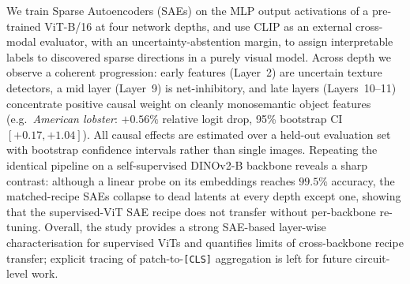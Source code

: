 We train Sparse Autoencoders (SAEs) on the MLP output activations of a pre-trained ViT-B/16 at four network depths, and use CLIP as an external cross-modal evaluator, with an uncertainty-abstention margin, to assign interpretable labels to discovered sparse directions in a purely visual model. Across depth we observe a coherent progression: early features (Layer~2) are uncertain texture detectors, a mid layer (Layer~9) is net-inhibitory, and late layers (Layers~10--11) concentrate positive causal weight on cleanly monosemantic object features (e.g.\ \textit{American lobster}: $+0.56\%$ relative logit drop, 95\% bootstrap CI $[+0.17,+1.04]$). All causal effects are estimated over a held-out evaluation set with bootstrap confidence intervals rather than single images. Repeating the identical pipeline on a self-supervised DINOv2-B backbone reveals a sharp contrast: although a linear probe on its embeddings reaches $99.5\%$ accuracy, the matched-recipe SAEs collapse to dead latents at every depth except one, showing that the supervised-ViT SAE recipe does not transfer without per-backbone re-tuning. Overall, the study provides a strong SAE-based layer-wise characterisation for supervised ViTs and quantifies limits of cross-backbone recipe transfer; explicit tracing of patch-to-\texttt{[CLS]} aggregation is left for future circuit-level work.
